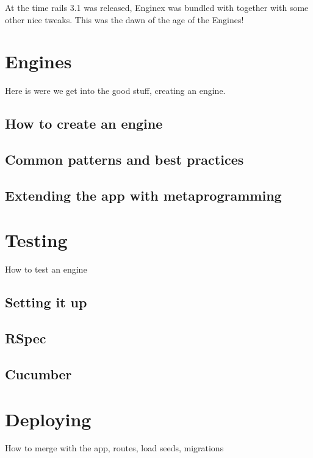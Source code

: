\documentclass[12pt,a4paper,twoside]{book}
\begin{document}
At the time rails 3.1 was released, Enginex was bundled with together with some other nice tweaks. This was the dawn of the age of the Engines!\\

\chapter{Engines}

Here is were we get into the good stuff, creating an engine.

\section{How to create an engine}

\section{Common patterns and best practices}

\section{Extending the app with metaprogramming}

\chapter{Testing}

How to test an engine

\section{Setting it up}

\section{RSpec}

\section{Cucumber}

\chapter{Deploying}
How to merge with the app, routes, load seeds, migrations
\end{document}
